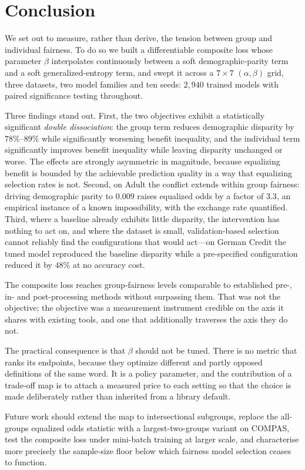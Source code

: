 \section{Conclusion}
\label{sec:conclusion}

We set out to measure, rather than derive, the tension between group and
individual fairness. To do so we built a differentiable composite loss whose
parameter $\beta$ interpolates continuously between a soft demographic-parity
term and a soft generalized-entropy term, and swept it across a $7\times7$
$(\alpha,\beta)$ grid, three datasets, two model families and ten seeds:
$2{,}940$ trained models with paired significance testing throughout.

Three findings stand out. First, the two objectives exhibit a statistically
significant \emph{double dissociation}: the group term reduces demographic
disparity by $78\%$--$89\%$ while significantly worsening benefit inequality,
and the individual term significantly improves benefit inequality while
leaving disparity unchanged or worse. The effects are strongly asymmetric in
magnitude, because equalizing benefit is bounded by the achievable prediction
quality in a way that equalizing selection rates is not. Second, on Adult the
conflict extends within group fairness: driving demographic parity to $0.009$
raises equalized odds by a factor of $3.3$, an empirical instance of a known
impossibility, with the exchange rate quantified. Third, where a baseline
already exhibits little disparity, the intervention has nothing to act on, and
where the dataset is small, validation-based selection cannot reliably find
the configurations that would act---on German Credit the tuned model
reproduced the baseline disparity while a pre-specified configuration reduced
it by $48\%$ at no accuracy cost.

The composite loss reaches group-fairness levels comparable to established
pre-, in- and post-processing methods without surpassing them. That was not
the objective; the objective was a measurement instrument credible on the axis
it shares with existing tools, and one that additionally traverses the axis
they do not.

The practical consequence is that $\beta$ should not be tuned. There is no
metric that ranks its endpoints, because they optimize different and partly
opposed definitions of the same word. It is a policy parameter, and the
contribution of a trade-off map is to attach a measured price to each setting
so that the choice is made deliberately rather than inherited from a library
default.

Future work should extend the map to intersectional subgroups, replace the
all-groups equalized odds statistic with a largest-two-groups variant on
COMPAS, test the composite loss under mini-batch training at larger scale, and
characterise more precisely the sample-size floor below which fairness
model selection ceases to function.
